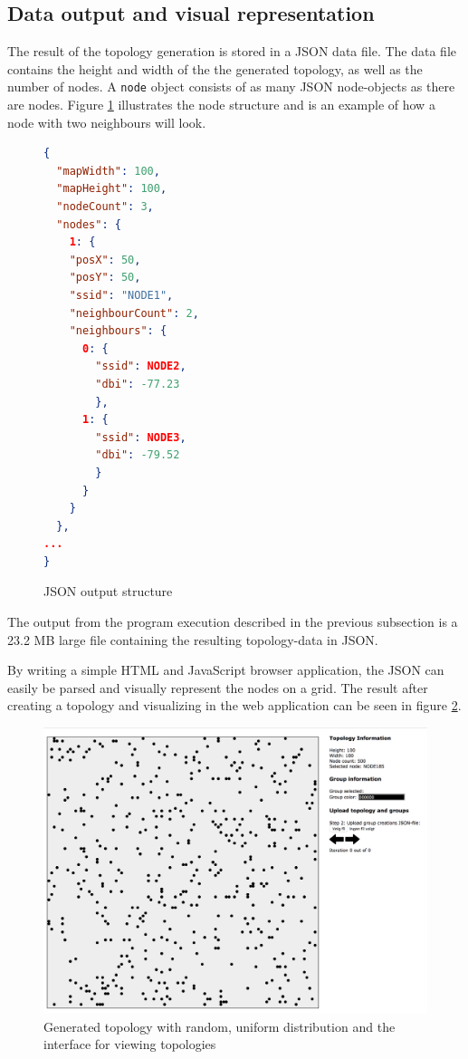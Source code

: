 \subsection{Data output and visual representation} \label{simulationrep}
The result of the topology generation is stored in a JSON \cite{JSON} data file.
The data file contains the height and width of the the generated topology, as well
as the number of nodes.
A \verb|node| object consists of as many JSON node-objects as there are nodes. Figure \ref{fig:nodeStruct} illustrates the node structure and is an example of how a node with two neighbours will look.
			\begin{figure}
			\begin{minipage}{\linewidth}
			\begin{lstlisting}[language=json]
{
  "mapWidth": 100,
  "mapHeight": 100,
  "nodeCount": 3,
  "nodes": {
    1: {
    "posX": 50,
    "posY": 50, 
    "ssid": "NODE1", 
    "neighbourCount": 2, 
    "neighbours": {
      0: {
        "ssid": NODE2,
        "dbi": -77.23
        },
      1: {
        "ssid": NODE3,
        "dbi": -79.52
        }
      }
    }
  },
...
}
\end{lstlisting}
\end{minipage}
\caption{JSON output structure}
\label{fig:nodeStruct}

\end{figure}

The output from the program execution described in the previous subsection is a 23.2 MB large file containing the resulting topology-data in JSON.

By writing a simple HTML and JavaScript browser application, the JSON can easily be parsed and visually represent the nodes on a grid.
The result after creating a topology and visualizing in the web application can be seen in figure \ref{fig:randtop}.

\begin{figure}
\center
\includegraphics[scale=0.3]{Images/interface.png}
\caption{Generated topology with random, uniform distribution and the interface for viewing topologies}
\label{fig:randtop}
\end{figure}

